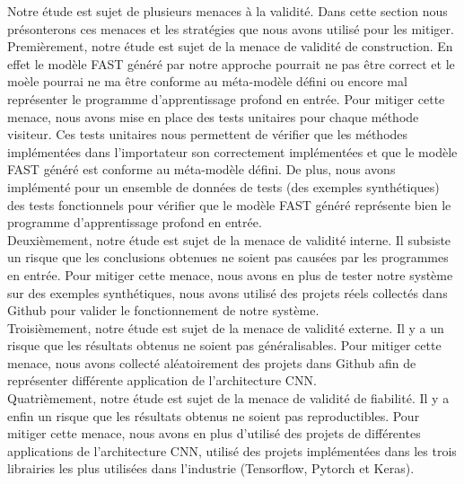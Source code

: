 \label{sec:threats}
Notre étude est sujet de plusieurs menaces à la validité. Dans cette section
nous présonterons ces menaces et les stratégies que nous avons utilisé pour les
mitiger.\\

Premièrement, notre étude est sujet de la menace de validité de construction. En
effet le modèle FAST généré par notre approche pourrait ne pas être correct et
le moèle pourrai ne ma être conforme au méta-modèle défini ou encore mal
représenter le programme d'apprentissage profond en entrée. Pour mitiger cette
menace, nous avons mise en place des tests unitaires pour chaque méthode
visiteur. Ces tests unitaires nous permettent de vérifier que les méthodes
implémentées dans l'importateur son correctement implémentées et que le modèle
FAST généré est conforme au méta-modèle défini. De plus, nous avons implémenté
pour un ensemble de données de tests (des exemples synthétiques) des tests
fonctionnels pour vérifier que le modèle FAST généré représente bien le
programme d'apprentissage profond en entrée.\\

Deuxièmement, notre étude est sujet de la menace de validité interne. Il
subsiste un risque que les conclusions obtenues ne soient pas causées par les
programmes en entrée. Pour mitiger cette menace, nous avons en plus de tester
notre système sur des exemples synthétiques, nous avons utilisé des projets
réels collectés dans Github pour valider le fonctionnement de notre système.\\

Troisièmement, notre étude est sujet de la menace de validité externe. Il y a un
risque que les résultats obtenus ne soient pas généralisables. Pour mitiger
cette menace, nous avons collecté aléatoirement des projets dans Github afin de
représenter différente application de l'architecture CNN.\\

Quatrièmement, notre étude est sujet de la menace de validité de fiabilité. Il y
a enfin un risque que les résultats obtenus ne soient pas reproductibles. Pour
mitiger cette menace, nous avons en plus d'utilisé des projets de différentes
applications de l'architecture CNN, utilisé des projets implémentées dans les
trois librairies les plus utilisées dans l'industrie (Tensorflow, Pytorch et Keras).



















